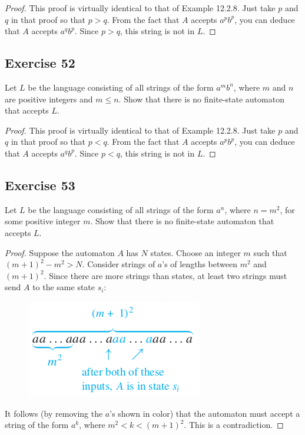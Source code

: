 \documentclass[14pt]{extarticle}
\begin{document}
\begin{proof}
This proof is virtually identical to that of Example 12.2.8. Just take \(p\) and \(q\) in that proof so that \(p > q\). 
From the fact that \(A\) accepts \(a^pb^p\), you can deduce that \(A\) accepts \(a^qb^p\). Since \(p > q\), this string is 
not in \(L\).
\end{proof}

\subsection{Exercise 52}
Let \(L\) be the language consisting of all strings of the form \(a^mb^n\), where \(m\) and \(n\) are positive integers 
and \(m \leq n\). Show that there is no finite-state automaton that accepts \(L\).

\begin{proof}
This proof is virtually identical to that of Example 12.2.8. Just take \(p\) and \(q\) in that proof so that \(p < q\). 
From the fact that \(A\) accepts \(a^pb^p\), you can deduce that \(A\) accepts \(a^qb^p\). Since \(p < q\), this string is 
not in \(L\).
\end{proof}

\subsection{Exercise 53}
Let \(L\) be the language consisting of all strings of the form \(a^n\), where \(n = m^2\), for some positive integer 
\(m\). Show that there is no finite-state automaton that accepts \(L\).

\begin{proof}
Suppose the automaton \(A\) has \(N\) states. Choose an integer \(m\) such that \((m + 1)^2 - m^2 > N\). Consider 
strings of \(a\)’s of lengths between \(m^2\) and \((m + 1)^2\). Since there are more strings than states, at least two 
strings must send \(A\) to the same state \(s_i\):

\begin{figure}[ht!]
\centering
\includegraphics[scale=0.5]{../images/12.2.53.png}
\end{figure}

It follows (by removing the \(a\)’s shown in color) that the automaton must accept a string of the form \(a^k\), where 
\(m^2 < k < (m + 1)^2\). This is a contradiction.
\end{proof}
\end{document}
